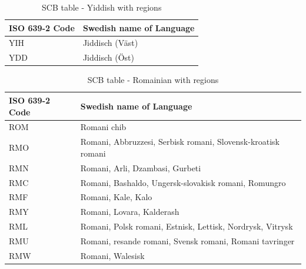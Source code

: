 \documentclass[12pt, twoside]{article}
\begin{document}

\begin{table}[!htp]
    \caption{SCB table - Yiddish with regions}
    \label{tab:SCByiddish}
    \begin{tabular}{L{3cm}|L{6.5cm}}
      \textbf{\gls{ISO} 639-2 Code} &\textbf{Swedish name of Language}\\
      \hline
YIH  &  Jiddisch (Väst)\\
YDD  &  Jiddisch (Öst)\\
\end{tabular}
\end{table}

\begin{table}[!htp]
    \caption{SCB table - Romainian with regions}
    \label{tab:SCBromani}
    \begin{tabular}{L{3cm}|L{6.5cm}}
      \textbf{\gls{ISO} 639-2 Code} &\textbf{Swedish name of Language}\\
      \hline
ROM &   Romani chib\\
RMO &   Romani, Abbruzzesi, Serbisk romani, Slovensk-kroatisk romani\\
RMN &   Romani, Arli, Dzambasi, Gurbeti\\
RMC &   Romani, Bashaldo, Ungersk-slovakisk romani, Romungro\\
RMF &   Romani, Kale, Kalo\\
RMY &   Romani, Lovara, Kalderash\\
RML &   Romani, Polsk romani, Estnisk, Lettisk, Nordrysk, Vitrysk\\
RMU &   Romani, resande romani, Svensk romani, Romani tavringer\\
RMW &   Romani, Walesisk\\
\end{tabular}
\end{table}
\end{document}
